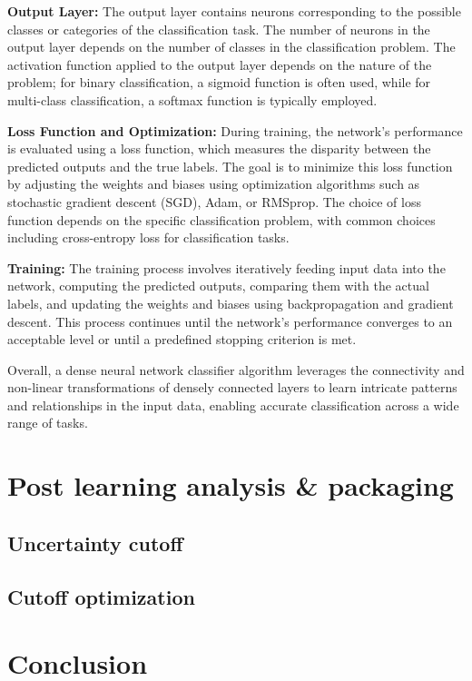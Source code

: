 \documentclass[preprint,aps,nofootinbib,a4paper,superscriptaddress,longbibliography,amsfonts,amssymb,amsmath,titlepage]{revtex4-2}
\begin{document}
\textbf{Output Layer:} The output layer contains neurons corresponding to the possible classes or categories of the classification task. The number of neurons in the output layer depends on the number of classes in the classification problem. The activation function applied to the output layer depends on the nature of the problem; for binary classification, a sigmoid function is often used, while for multi-class classification, a softmax function is typically employed.

\textbf{Loss Function and Optimization:} During training, the network's performance is evaluated using a loss function, which measures the disparity between the predicted outputs and the true labels. The goal is to minimize this loss function by adjusting the weights and biases using optimization algorithms such as stochastic gradient descent (SGD), Adam, or RMSprop. The choice of loss function depends on the specific classification problem, with common choices including cross-entropy loss for classification tasks.

\textbf{Training:} The training process involves iteratively feeding input data into the network, computing the predicted outputs, comparing them with the actual labels, and updating the weights and biases using backpropagation and gradient descent. This process continues until the network's performance converges to an acceptable level or until a predefined stopping criterion is met.

Overall, a dense neural network classifier algorithm leverages the connectivity and non-linear transformations of densely connected layers to learn intricate patterns and relationships in the input data, enabling accurate classification across a wide range of tasks.

\section{Post learning analysis \& packaging}


\subsection{Uncertainty cutoff}


\subsection{Cutoff optimization}


\section{Conclusion}

\end{document}
